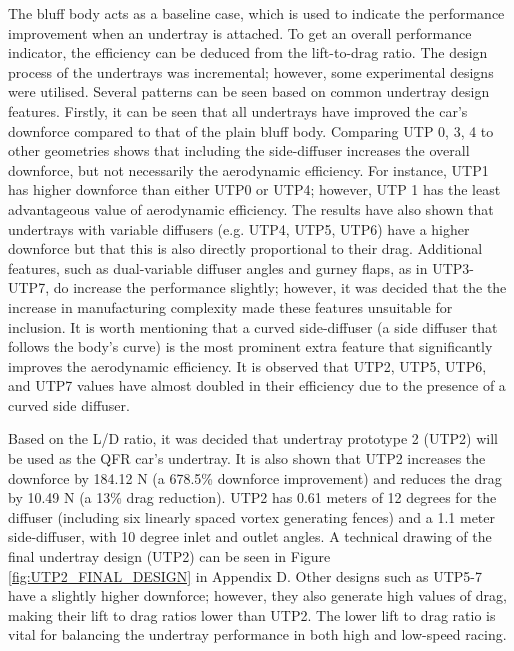 \noindent The bluff body acts as a baseline case, which is used to indicate the performance improvement when an undertray is attached. To get an overall performance indicator, the efficiency can be deduced from the lift-to-drag ratio. The design process of the undertrays was incremental; however, some experimental designs were utilised. Several patterns can be seen based on common undertray design features. Firstly, it can be seen that all undertrays have improved the car's downforce compared to that of the plain bluff body. Comparing UTP 0, 3, 4 to other geometries shows that including the side-diffuser increases the overall downforce, but not necessarily the aerodynamic efficiency. For instance, UTP1 has higher downforce than either UTP0 or UTP4; however, UTP 1 has the least advantageous value of aerodynamic efficiency. The results have also shown that undertrays with variable diffusers (e.g. UTP4, UTP5, UTP6) have a higher downforce but that this is also directly proportional to their drag. Additional features, such as dual-variable diffuser angles and gurney flaps, as in UTP3-UTP7, do increase the performance slightly; however, it was decided that the the increase in manufacturing complexity made these features unsuitable for inclusion. It is worth mentioning that a curved side-diffuser (a side diffuser that follows the body's curve) is the most prominent extra feature that significantly improves the aerodynamic efficiency. It is observed that UTP2, UTP5, UTP6, and UTP7 values have almost doubled in their efficiency due to the presence of a curved side diffuser.

\noindent Based on the L/D ratio, it was decided that undertray prototype 2 (UTP2) will be used as the QFR car's undertray. It is also shown that UTP2 increases the downforce by 184.12 N (a 678.5\% downforce improvement) and reduces the drag by 10.49 N (a 13\% drag reduction). UTP2 has 0.61 meters of 12 degrees for the diffuser (including six linearly spaced vortex generating fences) and a 1.1 meter side-diffuser, with 10 degree inlet and outlet angles. A technical drawing of the final undertray design (UTP2) can be seen in Figure \ref{fig:UTP2_FINAL_DESIGN} in Appendix D. Other designs such as UTP5-7  have a slightly higher downforce; however, they also generate high values of drag, making their lift to drag ratios lower than UTP2. The lower lift to drag ratio is vital for balancing the undertray performance in both high and low-speed racing.

